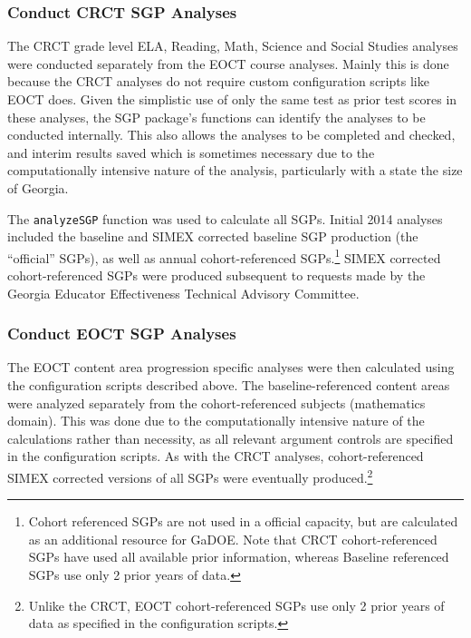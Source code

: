 \documentclass[12pt]{article}
\begin{document}
\subsubsection{Conduct CRCT SGP
Analyses}\label{conduct-crct-sgp-analyses}

The CRCT grade level ELA, Reading, Math, Science and Social Studies
analyses were conducted separately from the EOCT course analyses. Mainly
this is done because the CRCT analyses do not require custom
configuration scripts like EOCT does. Given the simplistic use of only
the same test as prior test scores in these analyses, the SGP package's
functions can identify the analyses to be conducted internally. This
also allows the analyses to be completed and checked, and interim
results saved which is sometimes necessary due to the computationally
intensive nature of the analysis, particularly with a state the size of
Georgia.

The \texttt{analyzeSGP} function was used to calculate all SGPs. Initial
2014 analyses included the baseline and SIMEX corrected baseline SGP
production (the ``official'' SGPs), as well as annual cohort-referenced
SGPs.\footnote{Cohort referenced SGPs are not used in a official
  capacity, but are calculated as an additional resource for GaDOE. Note
  that CRCT cohort-referenced SGPs have used all available prior
  information, whereas Baseline referenced SGPs use only 2 prior years
  of data.} SIMEX corrected cohort-referenced SGPs were produced
subsequent to requests made by the Georgia Educator Effectiveness
Technical Advisory Committee.

\subsubsection{Conduct EOCT SGP
Analyses}\label{conduct-eoct-sgp-analyses}

The EOCT content area progression specific analyses were then calculated
using the configuration scripts described above. The baseline-referenced
content areas were analyzed separately from the cohort-referenced
subjects (mathematics domain). This was done due to the computationally
intensive nature of the calculations rather than necessity, as all
relevant argument controls are specified in the configuration scripts.
As with the CRCT analyses, cohort-referenced SIMEX corrected versions of
all SGPs were eventually produced.\footnote{Unlike the CRCT, EOCT
  cohort-referenced SGPs use only 2 prior years of data as specified in
  the configuration scripts.}
\end{document}
